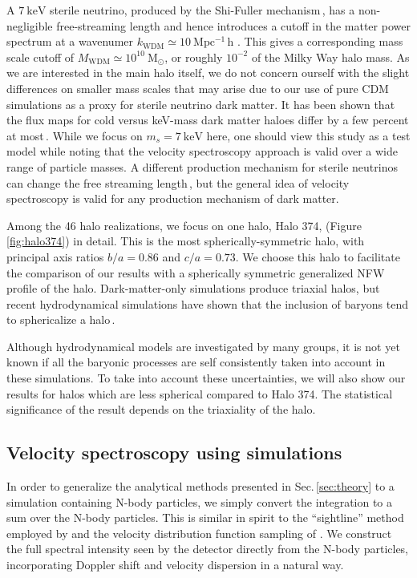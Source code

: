 \documentclass[aps,prd,10pt,twocolumn,superscriptaddress,showpacs]{revtex4-1}
\newcommand{\units}[1]{~\mathrm{#1}}
\begin{document}
A $7\units{keV}$ sterile neutrino, produced by the Shi-Fuller mechanism\,\cite{Shi:1998km}, has a non-negligible free-streaming length and hence introduces a cutoff in
the matter power spectrum at a wavenumer $k_\mathrm{WDM} \simeq 10 \units{Mpc^{-1}\,h}$
\cite{ven2016}. This gives a corresponding mass scale cutoff of $M_\mathrm{WDM} \simeq 10^{10}
\units{M_\odot}$, or roughly $10^{-2}$ of the Milky Way halo mass. As we are interested in the main
halo itself, we do not concern ourself with the slight differences on smaller mass scales that may
arise due to our use of pure CDM simulations as a proxy for sterile neutrino dark matter. 
It has been shown that the flux maps for cold versus keV-mass dark matter
haloes differ by a few percent at most\,\cite{Lovell:2014lea}. While we focus on $m_s=7\units{keV}$ here,
one should view this study as a test model while noting that the velocity spectroscopy approach is
valid over a wide range of particle masses.  A different production mechanism for sterile neutrinos can change the free streaming length\,\cite{Merle:2014xpa}, but the general idea of velocity spectroscopy is valid for any production mechanism of dark matter.

Among the 46 halo realizations, we focus on one halo, Halo 374, (Figure\,\ref{fig:halo374}) in detail. This is the most spherically-symmetric halo, with principal axis ratios $b/a=0.86$ and $c/a=0.73$.  We choose this halo to facilitate the comparison of our results with a spherically symmetric generalized NFW profile of the halo.  Dark-matter-only simulations produce triaxial halos, but recent hydrodynamical simulations have shown that the inclusion of baryons tend to sphericalize a halo\,\cite{Debattista:2007yz,Bryan:2012mw,Bernal:2014mmt,Bernal:2016guq}.

Although hydrodynamical models are investigated by many groups, it is not yet known if all the baryonic processes are self consistently taken into account in these simulations.  To take into account these uncertainties, we will also show our results for halos which are less spherical compared to Halo 374.  The statistical significance of the result depends on the triaxiality of the halo.


\subsection{Velocity spectroscopy using simulations}
\label{sec:simulations}

In order to generalize the analytical methods presented in Sec.\,\ref{sec:theory} to a simulation
containing N-body particles, we simply convert the integration to a sum over the N-body particles.
This is similar in spirit to the ``sightline'' method employed by \cite{Lovell:2014lea} and the
velocity distribution function sampling of \cite{Mao:2012hf}.  We construct the full spectral
intensity seen by the detector directly from the N-body particles, incorporating Doppler shift and
velocity dispersion in a natural way.   
\end{document}
